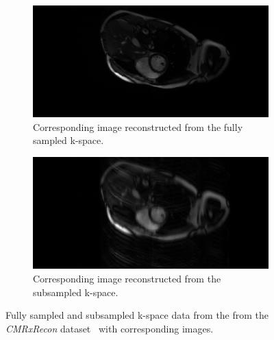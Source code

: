 \documentclass[english,version-2022-01]{uzl-thesis} %
\begin{document}
\begin{figure}[h]
\begin{subfigure}{0.45\textwidth}
	\end{subfigure}\\
	\begin{subfigure}{0.45\textwidth}
    		\includegraphics[width=\textwidth]{image_fullysampled.png}
    		\caption{Corresponding image reconstructed from the fully sampled k-space.}
    		\label{fig:fullySampledImage}
	\end{subfigure}
	\hfill
	\begin{subfigure}{0.45\textwidth}
    		\includegraphics[width=\textwidth]{image_subsampled.png}
    		\caption{Corresponding image reconstructed from the subsampled k-space.}
    		\label{fig:subSampledImage}
	\end{subfigure}
	\caption{Fully sampled and subsampled k-space data from the from the \emph{CMRxRecon} dataset~\cite{CMRxRecon} with corresponding images.}
	\label{fig:k-space}
\end{figure}


\end{document}
